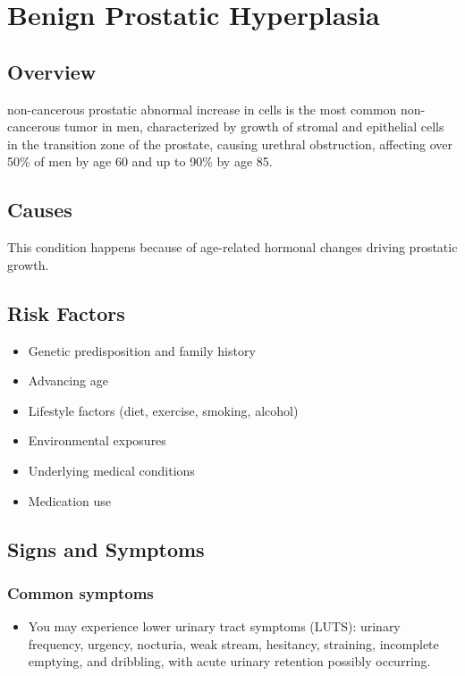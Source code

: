 \chapter{Benign Prostatic Hyperplasia}
\label{sec:Benign Prostatic Hyperplasia}

\section{Overview}
non-cancerous prostatic abnormal increase in cells is the most common non-cancerous tumor in men, characterized by growth of stromal and epithelial cells in the transition zone of the prostate, causing urethral obstruction, affecting over 50\% of men by age 60 and up to 90\% by age 85.
\section{Causes}
This condition happens because of age-related hormonal changes driving prostatic growth.     
\section{Risk Factors}

\begin{itemize}[noitemsep]
  \item Genetic predisposition and family history
  \item Advancing age
  \item Lifestyle factors (diet, exercise, smoking, alcohol)
  \item Environmental exposures
  \item Underlying medical conditions
  \item Medication use
\end{itemize}
\section{Signs and Symptoms}

\subsection{Common symptoms}
\begin{itemize}[noitemsep]
  \item You may experience lower urinary tract symptoms (LUTS): urinary frequency, urgency, nocturia, weak stream, hesitancy, straining, incomplete emptying, and dribbling, with acute urinary retention possibly occurring. 
  \end{itemize}

